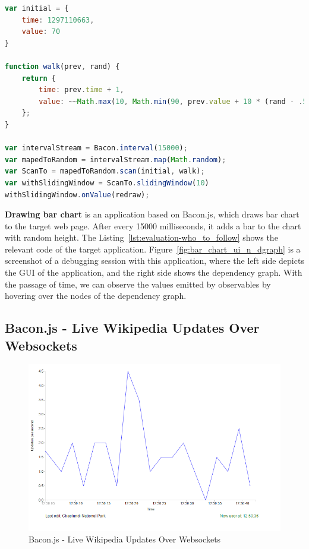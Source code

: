 \begin{lstlisting}[language=JavaScript, caption=Bacon.js -Drawing Bar Chart, label={lst:evaluation-drawing_bar_chart}]
var initial = {
	time: 1297110663,
	value: 70
}

function walk(prev, rand) {
	return {
		time: prev.time + 1,
		value: ~~Math.max(10, Math.min(90, prev.value + 10 * (rand - .5)))
	};
}

var intervalStream = Bacon.interval(15000);
var mapedToRandom = intervalStream.map(Math.random);
var ScanTo = mapedToRandom.scan(initial, walk);
var withSlidingWindow = ScanTo.slidingWindow(10)
withSlidingWindow.onValue(redraw);
\end{lstlisting}

\textbf{Drawing bar chart} is an application based on Bacon.js, which draws bar chart to the target web page. After every 15000 milliseconds, it adds a bar to the chart with random height. 
The Listing~\ref{lst:evaluation-who_to_follow} shows the relevant code of the target application. Figure~\ref{fig:bar_chart_ui_n_dgraph} is a screenshot of a debugging session with this application, where the left side depicts the GUI of the application, and the right side shows the dependency graph. With the passage of time, we can observe the values emitted by observables by hovering over the nodes of the dependency graph.




\subsection{Bacon.js - Live Wikipedia Updates Over Websockets}

\begin{figure}[!h]
	\centering
	\includegraphics[width=\textwidth,height=\textheight,keepaspectratio]{gfx/evaluation/w_pedia_updates_over_websocket_ui.png}
	\caption{Bacon.js - Live Wikipedia Updates Over Websockets}
	\label{fig:w_pedia_updates_over_websocket_ui}
\end{figure}

